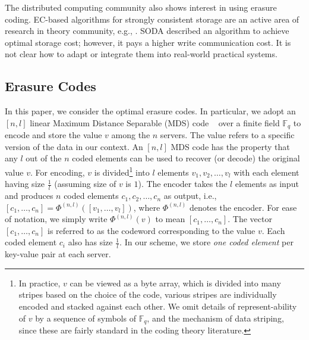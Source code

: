 The distributed computing community also shows interest in using erasure coding.
EC-based algorithms for strongly consistent storage are an active area of research in theory community, e.g., \cite{CadambeLMM17, SODA2016, LDS2017, NicolaouC0KML19}.  SODA\cite{SODA2016} described an algorithm to achieve optimal storage cost; however, it pays a 
higher write communication cost.  It is not clear how to adapt or integrate them into real-world practical systems.



\subsection{Erasure Codes}
In this paper, we consider the optimal erasure codes. In particular, we adopt an $[n, l]$  linear Maximum Distance Separable (MDS) code ~\cite{verapless_book} over a finite field $\mathbb{F}_q$ to encode and store the value $v$ among the $n$ servers. The value refers to a specific version of the data in our context. An $[n, l]$ MDS code has the property that any $l$ out of the $n$ coded elements can be used to recover (or decode) the original value $v$. 
For encoding, $v$ is divided\footnote{In practice, $v$ can be viewed as a byte array, which is divided into many stripes based on the choice of the code, various stripes are individually encoded and stacked against each other. We omit details of represent-ability of $v$ by a sequence of symbols of $\mathbb{F}_q$, and the mechanism of data striping, since these are fairly standard in the coding theory literature.} into $l$ elements $v_1, v_2, \ldots, v_l$ with each element having  size $\frac{1}{l}$ (assuming size of $v$ is $1$). The encoder takes the $l$ elements as input and produces $n$ coded elements $c_1, c_2, \ldots, c_n$ as output, i.e., $[c_1, \ldots, c_n] = \Phi^{(n,l)}([v_1, \ldots, v_l])$, where $\Phi^{(n, l)}$ denotes the encoder. For ease of notation, we simply write $\Phi^{(n, l)}(v)$ to mean  $[c_1, \ldots, c_n]$. The vector $[c_1, \ldots, c_n]$ is  referred to as the codeword corresponding to the value $v$. Each coded element $c_i$ also has  size $\frac{1}{l}$. In our scheme, we store \textit{one coded element} per key-value pair at each server. 

